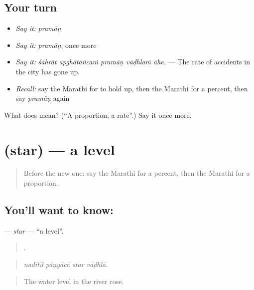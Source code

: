 \subsection*{Your turn}
\begin{itemize}
\raggedright
  \item \emph{Say it:} \emph{pramāṇ}
  \item \emph{Say it:} \emph{pramāṇ}, once more
  \item \emph{Say it:} \emph{śahrāt apghātāñcaṁ pramāṇ vāḍhlaṁ āhe.} — The rate of accidents in the city has gone up.
  \item \emph{Recall:} say the Marathi for to hold up, then the Marathi for a percent, then say \emph{pramāṇ} again
\end{itemize}

\begin{tcolorbox}[breakable,colback=teal!4,colframe=teal!35!black,title={Before you move on}]
What does  mean? (\textquotedblleft{}A proportion; a rate\textquotedblright{}.) Say it once more.
\end{tcolorbox}
\section[\texorpdfstring{\mr{स्तर} (star)}{स्तर (star)}]{ (star) — a level}

\label{lesson:MR-C391-star}



\begin{quote}
Before the new one: say the Marathi for a percent, then the Marathi for a proportion.
\end{quote}

\subsection*{You'll want to know: }
\textbf{} — \emph{star} — \textquotedblleft{}a level\textquotedblright{}.

\begin{quote}
   .
\end{quote}

\begin{quote}
\emph{nadītīl pāṇyācā star vāḍhlā.}
\end{quote}

\begin{quote}
The water level in the river rose.
\end{quote}


